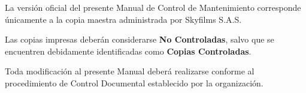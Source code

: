 \vspace{0.2cm}

\begin{tcolorbox}[title=Control de Vigencia,colback=gray!5,colframe=black]

La versión oficial del presente Manual de Control de Mantenimiento corresponde únicamente a la copia maestra administrada por Skyfilms S.A.S.

Las copias impresas deberán considerarse \textbf{No Controladas}, salvo que se encuentren debidamente identificadas como \textbf{Copias Controladas}.

Toda modificación al presente Manual deberá realizarse conforme al procedimiento de Control Documental establecido por la organización.

\end{tcolorbox}


